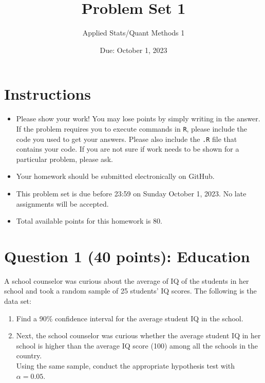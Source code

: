 \documentclass[12pt,letterpaper]{article}
\title{Problem Set 1}
\date{Due: October 1, 2023}
\author{Applied Stats/Quant Methods 1}
\begin{document}
	\maketitle
	
	\section*{Instructions}
	\begin{itemize}
	\item Please show your work! You may lose points by simply writing in the answer. If the problem requires you to execute commands in \texttt{R}, please include the code you used to get your answers. Please also include the \texttt{.R} file that contains your code. If you are not sure if work needs to be shown for a particular problem, please ask.
\item Your homework should be submitted electronically on GitHub.
\item This problem set is due before 23:59 on Sunday October 1, 2023. No late assignments will be accepted.
\item Total available points for this homework is 80.
	\end{itemize}
	
	\vspace{1cm}
	\section*{Question 1 (40 points): Education}

A school counselor was curious about the average of IQ of the students in her school and took a random sample of 25 students' IQ scores. The following is the data set:\\
\vspace{.5cm}

  

\vspace{1cm}

\begin{enumerate}
	\item Find a 90\% confidence interval for the average student IQ in the school.\\
	
	\item Next, the school counselor was curious  whether  the average student IQ in her school is higher than the average IQ score (100) among all the schools in the country.\\ 
	
	\noindent Using the same sample, conduct the appropriate hypothesis test with $\alpha=0.05$.
\end{enumerate}
\end{document}
